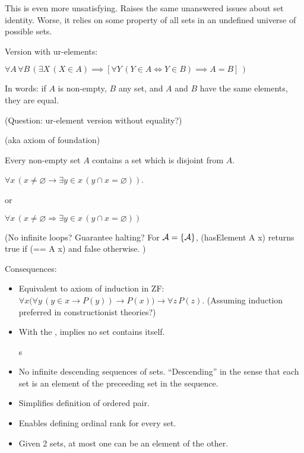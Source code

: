 This is even more unsatisfying. 
Raises the same unanswered issues about set identity.
Worse, it relies on some property of all sets in an undefined 
universe of possible sets.

Version with ur-elements:

$\forall A\,\forall B\,(\exists X\,(X\in A)\implies
 [\forall Y\,(Y\in A\iff Y\in B)\implies A=B]\,)$
 
In words: 
if $A$ is non-empty, $B$ any set, and $A$ and $B$ have the same
elements, they are equal.

(Question: ur-element version without equality?)


(aka axiom of foundation)~\cite{wiki:Axiom_of_regularity}

Every non-empty set $A$ contains a set which is disjoint from $A$.

$\forall x\,(x\neq \varnothing
\rightarrow 
\exists y\in x\,(y\cap x=\varnothing ))$.
 
or
 
$\forall x\,(x\neq \varnothing \Rightarrow 
 \exists y\in x\,(y\cap x=\varnothing ))$
 
(No infinite loops? Guarantee halting? 
For $\mathcal{A} = \{\mathcal{A}\}$,
\textsf{(hasElement A x)} 
returns \textsf{true} if \textsf{(== A x)}
and \textsf{false} otherwise. )

Consequences:
\begin{itemize}
\item 
Equivalent to axiom of induction\cite{wiki:Epsilon-induction} 
in ZF:
$\forall x
{\Big (}
\forall y\,(y\in x\rightarrow P(y))\rightarrow P(x)
{\Big )}
\rightarrow \forall z\,P(z)$.
(Assuming induction preferred in constructionist theories?)

\item With the , 
implies no set contains itself.

s\item No infinite descending sequences of sets.
``Descending'' in the sense that each set is an element of the
preceeding set in the sequence.

\item Simplifies definition of ordered pair.

\item Enables defining ordinal rank for every set.

\item Given 2 sets, at most one can be an element of the other.
\end{itemize}

